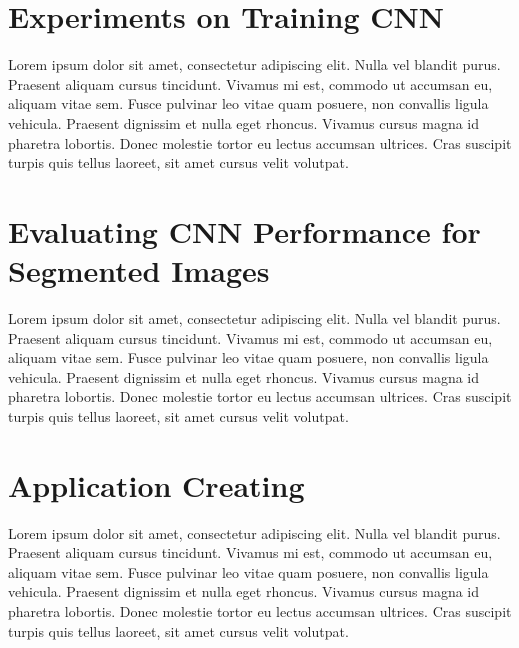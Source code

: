 \vspace{-0.3cm}

\section{Experiments on Training CNN}\label{sec:5.4}
\vspace{-0.5cm}
\noindent Lorem ipsum dolor sit amet, consectetur adipiscing elit. Nulla vel blandit purus. Praesent aliquam cursus tincidunt. Vivamus mi est, commodo ut accumsan eu, aliquam vitae sem. Fusce pulvinar leo vitae quam posuere, non convallis ligula vehicula. Praesent dignissim et nulla eget rhoncus. Vivamus cursus magna id pharetra lobortis. Donec molestie tortor eu lectus accumsan ultrices. Cras suscipit turpis quis tellus laoreet, sit amet cursus velit volutpat.

\vspace{-0.3cm}

\section{Evaluating CNN Performance for Segmented Images}\label{sec:5.5}
\vspace{-0.5cm}
\noindent Lorem ipsum dolor sit amet, consectetur adipiscing elit. Nulla vel blandit purus. Praesent aliquam cursus tincidunt. Vivamus mi est, commodo ut accumsan eu, aliquam vitae sem. Fusce pulvinar leo vitae quam posuere, non convallis ligula vehicula. Praesent dignissim et nulla eget rhoncus. Vivamus cursus magna id pharetra lobortis. Donec molestie tortor eu lectus accumsan ultrices. Cras suscipit turpis quis tellus laoreet, sit amet cursus velit volutpat.

\vspace{-0.3cm}

\section{Application Creating}\label{sec:5.6}
\vspace{-0.5cm}
\noindent Lorem ipsum dolor sit amet, consectetur adipiscing elit. Nulla vel blandit purus. Praesent aliquam cursus tincidunt. Vivamus mi est, commodo ut accumsan eu, aliquam vitae sem. Fusce pulvinar leo vitae quam posuere, non convallis ligula vehicula. Praesent dignissim et nulla eget rhoncus. Vivamus cursus magna id pharetra lobortis. Donec molestie tortor eu lectus accumsan ultrices. Cras suscipit turpis quis tellus laoreet, sit amet cursus velit volutpat.

